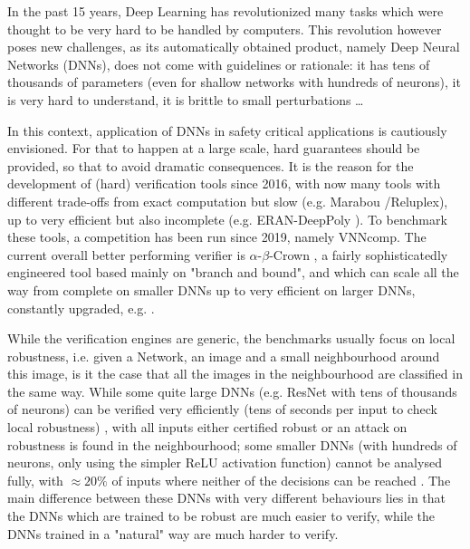 In the past 15 years, Deep Learning has revolutionized many tasks which were thought to be very hard to be handled by computers. This revolution however poses new challenges, as its automatically obtained product, namely Deep Neural Networks (DNNs), does not come with guidelines or rationale: it has tens of thousands of parameters (even for shallow networks with hundreds of neurons), it is very hard to understand, it is brittle to small perturbations \cite{szegedy}\dots

In this context, application of DNNs in safety critical applications is cautiously envisioned. For that to happen at a large scale, hard guarantees should be provided, so that to avoid dramatic consequences. It is the reason for the development of (hard) verification tools since 2016, with now many tools with different trade-offs from exact computation but slow (e.g. Marabou \cite{katz2019marabou}/Reluplex\cite{Reluplex}), up to very efficient but also incomplete (e.g. ERAN-DeepPoly \cite{deeppoly}). To benchmark these tools, a competition has been run since 2019, namely VNNcomp. The current overall better performing verifier is $\alpha$-$\beta$-Crown \cite{crown}, a fairly sophisticatedly engineered tool based mainly on "branch and bound", and which can scale all the way from complete on smaller DNNs \cite{xu2020fast} up to very efficient on larger DNNs, constantly upgraded, e.g. \cite{cutting}.

While the verification engines are generic, the benchmarks usually focus on local robustness, i.e. given a Network, an image and a small neighbourhood around this image, 
is it the case that all the images in the neighbourhood are classified in the same way.
While some quite large DNNs (e.g. ResNet with tens of thousands of neurons) can be verified very efficiently (tens of seconds per input to check local robustness) \cite{crown}, with all inputs either certified robust or an attack on robustness is found in the neighbourhood;
some smaller DNNs (with hundreds of neurons, only using the simpler ReLU activation function) cannot be analysed fully, with $\approx 20 \%$ of inputs where neither of the decisions can be reached \cite{crown}. The main difference between these DNNs with very different behaviours lies in that the DNNs which are trained to be robust are much easier to verify, while the DNNs trained in a "natural" way are much harder to verify.


